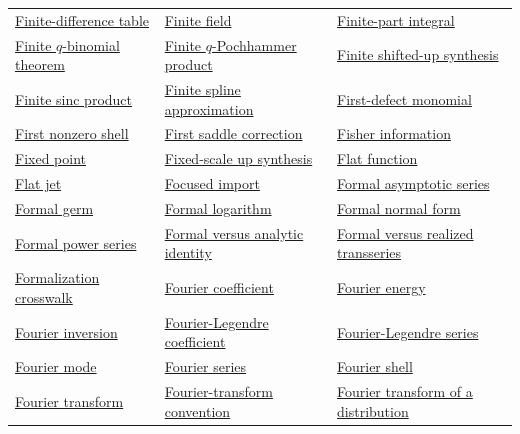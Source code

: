 \documentclass[11pt,oneside]{article}
\begin{document}
\begin{longtable}{L{0.31\textwidth}L{0.31\textwidth}L{0.31\textwidth}}
\hyperlink{gls:finite-difference-table}{Finite-difference table} & \hyperlink{gls:finite-field}{Finite field} & \hyperlink{gls:finite-part-integral}{Finite-part integral} \\
\hyperlink{gls:finite-q-binomial-theorem}{Finite \(q\)-binomial theorem} & \hyperlink{gls:finite-q-pochhammer-product}{Finite \(q\)-Pochhammer product} & \hyperlink{gls:finite-shifted-up-synthesis}{Finite shifted-up synthesis} \\
\hyperlink{gls:finite-sinc-product}{Finite sinc product} & \hyperlink{gls:finite-spline-approximation}{Finite spline approximation} & \hyperlink{gls:first-defect-monomial}{First-defect monomial} \\
\hyperlink{gls:first-nonzero-shell}{First nonzero shell} & \hyperlink{gls:first-saddle-correction}{First saddle correction} & \hyperlink{gls:fisher-information}{Fisher information} \\
\hyperlink{gls:fixed-point}{Fixed point} & \hyperlink{gls:fixed-scale-up-synthesis}{Fixed-scale up synthesis} & \hyperlink{gls:flat-function}{Flat function} \\
\hyperlink{gls:flat-jet}{Flat jet} & \hyperlink{gls:focused-import}{Focused import} & \hyperlink{gls:formal-asymptotic-series}{Formal asymptotic series} \\
\hyperlink{gls:formal-germ}{Formal germ} & \hyperlink{gls:formal-logarithm}{Formal logarithm} & \hyperlink{gls:formal-normal-form}{Formal normal form} \\
\hyperlink{gls:formal-power-series}{Formal power series} & \hyperlink{gls:formal-versus-analytic-identity}{Formal versus analytic identity} & \hyperlink{gls:formal-versus-realized-transseries}{Formal versus realized transseries} \\
\hyperlink{gls:formalization-crosswalk}{Formalization crosswalk} & \hyperlink{gls:fourier-coefficient}{Fourier coefficient} & \hyperlink{gls:fourier-energy}{Fourier energy} \\
\hyperlink{gls:fourier-inversion}{Fourier inversion} & \hyperlink{gls:fourier-legendre-coefficient}{Fourier-Legendre coefficient} & \hyperlink{gls:fourier-legendre-series}{Fourier-Legendre series} \\
\hyperlink{gls:fourier-mode}{Fourier mode} & \hyperlink{gls:fourier-series}{Fourier series} & \hyperlink{gls:fourier-shell}{Fourier shell} \\
\hyperlink{gls:fourier-transform}{Fourier transform} & \hyperlink{gls:fourier-convention}{Fourier-transform convention} & \hyperlink{gls:transform-of-a-distribution}{Fourier transform of a distribution} \\

\end{longtable}
\end{document}
